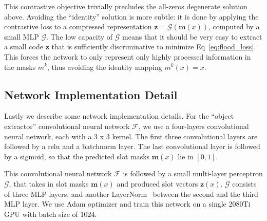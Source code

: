 \documentclass{article}
\newcommand{\jd}[1]{\textcolor{orange}{[DJ: #1]}}
\begin{document}
This contrastive objective trivially precludes the all-zeros degenerate solution above. Avoiding the ``identity'' solution is more subtle: it is done by applying the contrastive loss to a compressed representation $\bm{z}=\mathcal{G}(\bm{m}(x))$, computed by a small MLP $\mathcal{G}$. The low capacity of $\mathcal{G}$ means that it should be very easy to extract a small code $\bm{z}$ that is sufficiently discriminative to minimize Eq~\ref{eq:flood_loss}. This forces the network to only represent only highly processed information in the masks $m^k$, thus avoiding the identity mapping $m^k(x)=x$. 

\subsection{Network Implementation Detail}

Lastly we describe some network implementation details. For the ``object extractor'' convolutional neural network $\mathcal{F}$, we use a four-layers convolutional neural network, each with a 3 x 3 kernel. The first three convolutional layers are followed by a relu and a batchnorm layer. The last convolutional layer is followed by a sigmoid, so that the predicted slot masks $\bm{m}(x)$ lie in $[0,1]$. 

This convolutional neural network $\mathcal{F}$ is followed by a small multi-layer perceptron $\mathcal{G}$, that takes in slot masks $\bm{m}(x)$ and produced slot vectors $\bm{z}(x)$. $\mathcal{G}$ consists of three MLP layers, and another LayerNorm~\cite{LayerN} between the second and the third MLP layer. We use Adam optimizer and train this network on a single 2080Ti GPU with batch size of 1024. 





\end{document}
